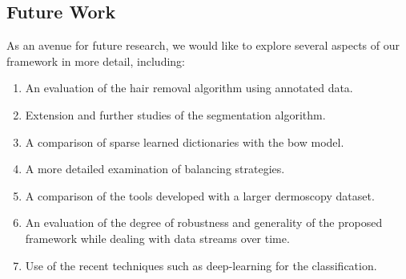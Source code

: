 \subsection{Future Work}
As an avenue for future research, we would like to explore several aspects of our framework in more detail, including:
\begin{enumerate}[i]
\item An evaluation of the hair removal algorithm using annotated data. 
\item Extension and further studies of the segmentation algorithm.
\item A comparison of sparse learned dictionaries with the \acl{bow} model.
\item A more detailed examination of balancing strategies.
\item A comparison of the tools developed with a larger dermoscopy dataset.
\item An evaluation of the degree of robustness and generality of the proposed framework while dealing with data streams over time.
\item Use of the recent techniques such as deep-learning for the classification.
\end{enumerate}

%
%


